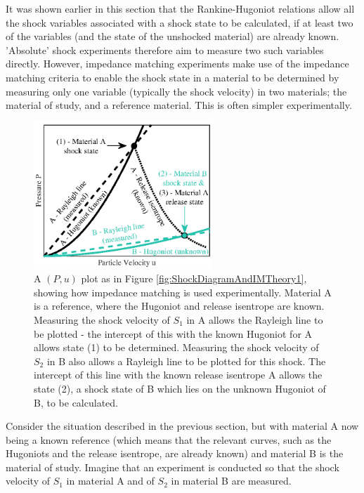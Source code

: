 
It was shown earlier in this section that the Rankine-Hugoniot relations allow all the shock variables associated with a shock state to be calculated, if at least two of the variables (and the state of the unshocked material) are already known. 'Absolute' shock experiments therefore aim to measure two such variables directly. However, impedance matching experiments make use of the impedance matching criteria to enable the shock state in a material to be determined by measuring only one variable (typically the shock velocity) in two materials; the material of study, and a reference material. This is often simpler experimentally.

\begin{figure}
\centering
\includegraphics[width=0.6\textwidth]{figures/Theory/MatlabIM2.eps}%
\caption{\label{fig:IMTheory2} A $(P,u)$ plot as in Figure \ref{fig:ShockDiagramAndIMTheory1}, showing how impedance matching is used experimentally. Material A is a reference, where the Hugoniot and release isentrope are known. Measuring the shock velocity of $S_1$ in A allows the Rayleigh line to be plotted - the intercept of this with the known Hugoniot for A allows state (1) to be determined. Measuring the shock velocity of $S_2$ in B also allows a Rayleigh line to be plotted for this shock. The intercept of this line with the known release isentrope A allows the state (2), a shock state of B which lies on the unknown Hugoniot of B, to be calculated.}
\end{figure}

Consider the situation described in the previous section, but with material A now being a known reference (which means that the relevant curves, such as the Hugoniots and the release isentrope, are already known) and material B is the material of study. Imagine that an experiment is conducted so that the shock velocity of $S_1$ in material A and of  $S_2$ in material B are measured.

